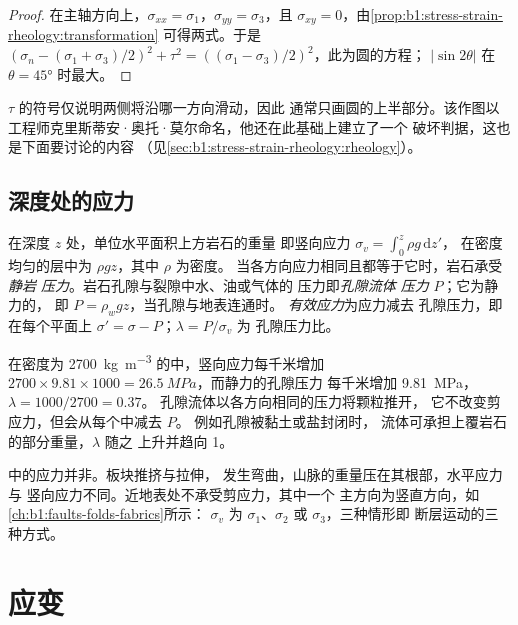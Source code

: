 \begin{proof}
在主轴方向上，$\sigma_{xx} = \sigma_1$，$\sigma_{yy} = \sigma_3$，且
$\sigma_{xy} = 0$，由\cref{prop:b1:stress-strain-rheology:transformation}
可得两式。于是
$(\sigma_n - (\sigma_1+\sigma_3)/2)^2 + \tau^2 = ((\sigma_1-\sigma_3)/2)^2$，此为圆的方程；
$|\sin2\theta|$ 在 $\theta = \ang{45}$ 时最大。
\end{proof}

$\tau$ 的符号仅说明两侧将沿哪一方向滑动，因此
通常只画圆的上半部分。该作图以
工程师克里斯蒂安·奥托·莫尔命名，他还在此基础上建立了一个
破坏判据，这也是下面要讨论的内容
（见\cref{sec:b1:stress-strain-rheology:rheology}）。

\subsection*{深度处的应力}

\begin{definition}\label{def:b1:stress-strain-rheology:lithostatic}
在深度 $z$ 处，单位水平面积上方岩石的重量
即竖向应力 $\sigma_v = \int_0^z\rho g\,\mathrm dz'$，
在密度均匀的层中为 $\rho g z$，其中 $\rho$ 为密度。
当各方向应力相同且都等于它时，岩石承受\emph{静岩
压力}。岩石孔隙与裂隙中水、油或气体的
压力即\emph{孔隙流体
压力} $P$；它为静力的，
即 $P = \rho_w g z$，当孔隙与地表连通时。
\emph{有效应力}为应力减去
孔隙压力，即在每个平面上 $\sigma' = \sigma - P$；$\lambda = P/\sigma_v$ 为
孔隙压力比。
\end{definition}

在密度为 \qty{2700}{kg.m^{-3}} 的中，竖向应力每千米增加
$2700\times9.81\times1000 = \qty{26.5}{MPa}$，而静力的孔隙压力
每千米增加 \qty{9.81}{MPa}，$\lambda = 1000/2700 = 0.37$。
孔隙流体以各方向相同的压力将颗粒推开，
它不改变剪应力，但会从每个中减去 $P$。
例如孔隙被黏土或盐封闭时，
流体可承担上覆岩石的部分重量，$\lambda$ 随之
上升并趋向 1。

中的应力并非。板块推挤与拉伸，
发生弯曲，山脉的重量压在其根部，水平应力与
竖向应力不同。近地表处不承受剪应力，其中一个
主方向为竖直方向，如\cref{ch:b1:faults-folds-fabrics}所示：
$\sigma_v$ 为 $\sigma_1$、$\sigma_2$ 或 $\sigma_3$，三种情形即
断层运动的三种方式。

\section{应变}\label{sec:b1:stress-strain-rheology:strain}

